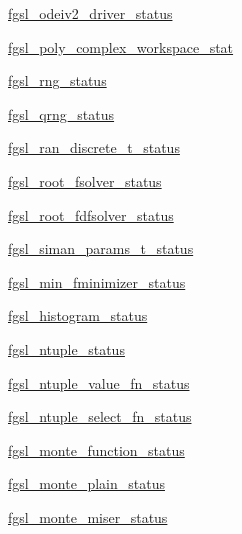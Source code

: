 \begin{DoxyCompactItemize}
\hyperlink{interfacefgsl__well__defined_a05c7f5e4b645b1d7902165a47d3926dc}{fgsl\+\_\+odeiv2\+\_\+driver\+\_\+status}
\item 
\hyperlink{interfacefgsl__well__defined_aa0223410e3db936f817a42eecf4e7be7}{fgsl\+\_\+poly\+\_\+complex\+\_\+workspace\+\_\+stat}
\item 
\hyperlink{interfacefgsl__well__defined_ab4562e7727a12c9dac1a81d3b431def1}{fgsl\+\_\+rng\+\_\+status}
\item 
\hyperlink{interfacefgsl__well__defined_a766e94d592780ef94a96d85e80940d6d}{fgsl\+\_\+qrng\+\_\+status}
\item 
\hyperlink{interfacefgsl__well__defined_ade977ef8bf64edf0d4d61b5cef9be9e2}{fgsl\+\_\+ran\+\_\+discrete\+\_\+t\+\_\+status}
\item 
\hyperlink{interfacefgsl__well__defined_a831b4f766e394ed2ee2d241f4f1c90de}{fgsl\+\_\+root\+\_\+fsolver\+\_\+status}
\item 
\hyperlink{interfacefgsl__well__defined_ad5c1a94585fc6e4f967e7d5ed84e91c1}{fgsl\+\_\+root\+\_\+fdfsolver\+\_\+status}
\item 
\hyperlink{interfacefgsl__well__defined_a017f6400ef2108e70f2565170176b249}{fgsl\+\_\+siman\+\_\+params\+\_\+t\+\_\+status}
\item 
\hyperlink{interfacefgsl__well__defined_aa13ac622192d0099afcfed0388a5f7a2}{fgsl\+\_\+min\+\_\+fminimizer\+\_\+status}
\item 
\hyperlink{interfacefgsl__well__defined_aed67793dbe54a71adb40f2756ecd831f}{fgsl\+\_\+histogram\+\_\+status}
\item 
\hyperlink{interfacefgsl__well__defined_ad390488295454f78ff1aa39132cbaba3}{fgsl\+\_\+ntuple\+\_\+status}
\item 
\hyperlink{interfacefgsl__well__defined_a459a96eb9f367db719ae038877f29d12}{fgsl\+\_\+ntuple\+\_\+value\+\_\+fn\+\_\+status}
\item 
\hyperlink{interfacefgsl__well__defined_afbd6733bbbdcbb08fec31a968ac5559d}{fgsl\+\_\+ntuple\+\_\+select\+\_\+fn\+\_\+status}
\item 
\hyperlink{interfacefgsl__well__defined_a9f89c4981bf5ec10c4864190ed091b9c}{fgsl\+\_\+monte\+\_\+function\+\_\+status}
\item 
\hyperlink{interfacefgsl__well__defined_a7d1ea58e14757a223b0b2003719798e1}{fgsl\+\_\+monte\+\_\+plain\+\_\+status}
\item 
\hyperlink{interfacefgsl__well__defined_a5ec0ede38be5235101fcbefeaa8df151}{fgsl\+\_\+monte\+\_\+miser\+\_\+status}
\item 

\end{DoxyCompactItemize}
